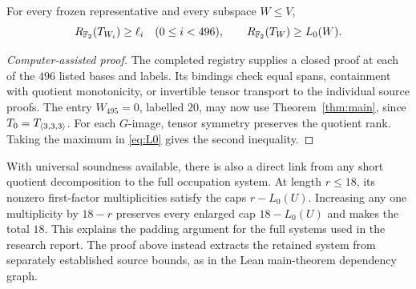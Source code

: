 \begin{proposition}\label{prop:global}
For every frozen representative and every subspace $W\leq V$,
\[
 R_{\mathbb F_2}(T_{W_i})\geq\ell_i\quad(0\leq i<496),
 \qquad R_{\mathbb F_2}(T_W)\geq L_0(W).
\]
\end{proposition}
\begin{proof}[Computer-assisted proof]
The completed registry supplies a closed proof at each of the $496$
listed bases and labels. Its bindings check equal spans, containment
with quotient monotonicity, or invertible tensor transport to the
individual source proofs. The entry $W_{495}=0$, labelled $20$, may
now use Theorem~\ref{thm:main}, since $T_0=T_{\langle3,3,3\rangle}$. For each $G$-image,
tensor symmetry preserves the quotient rank. Taking the maximum in
\eqref{eq:L0} gives the second inequality.
\end{proof}

With universal soundness available, there is also a direct link from
any short quotient decomposition to the full occupation system. At
length $r\leq18$, its nonzero first-factor multiplicities satisfy the
caps $r-L_0(U)$. Increasing any one multiplicity by $18-r$ preserves
every enlarged cap $18-L_0(U)$ and makes the total $18$. This explains
the padding argument for the full systems used in the research report.
The proof above instead extracts the retained system from separately
established source bounds, as in the Lean main-theorem dependency graph.
